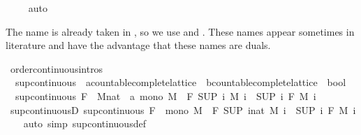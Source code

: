 \begin{isabellebody}
\ \ \ \isamarkupfalse%
\ auto\isanewline
\ \ \isamarkupfalse%
%
\endisatagproof
{\isafoldproof}%
%
\isadelimproof
%
\endisadelimproof
%
\begin{isamarkuptext}%
The name  is already taken in , so we use
   and . These names appear sometimes in literature
  and have the advantage that these names are duals.%
\end{isamarkuptext}\isamarkuptrue%
\isamarkupfalse%
\ order{\isacharunderscore}continuous{\isacharunderscore}intros%
\isadelimdocument
%
\endisadelimdocument
%
\isatagdocument
%
\isamarkuptrue%
%
\endisatagdocument
{\isafolddocument}%
%
\isadelimdocument
%
\endisadelimdocument
{}\isamarkupfalse%
\isanewline
\ \ sup{\isacharunderscore}continuous\ {\isacharcolon}{\isacharcolon}\ {\isachardoublequoteopen}{\isacharparenleft}{\isacharprime}a{\isacharcolon}{\isacharcolon}countable{\isacharunderscore}complete{\isacharunderscore}lattice\ {\isasymRightarrow}\ {\isacharprime}b{\isacharcolon}{\isacharcolon}countable{\isacharunderscore}complete{\isacharunderscore}lattice{\isacharparenright}\ {\isasymRightarrow}\ bool{\isachardoublequoteclose}\isanewline
{}\isanewline
\ \ {\isachardoublequoteopen}sup{\isacharunderscore}continuous\ F\ {\isasymlongleftrightarrow}\ {\isacharparenleft}{\isasymforall}M{\isacharcolon}{\isacharcolon}nat\ {\isasymRightarrow}\ {\isacharprime}a{\isachardot}\ mono\ M\ {\isasymlongrightarrow}\ F\ {\isacharparenleft}SUP\ i{\isachardot}\ M\ i{\isacharparenright}\ {\isacharequal}\ {\isacharparenleft}SUP\ i{\isachardot}\ F\ {\isacharparenleft}M\ i{\isacharparenright}{\isacharparenright}{\isacharparenright}{\isachardoublequoteclose}\isanewline
\isanewline
{}\isamarkupfalse%
\ sup{\isacharunderscore}continuousD{\isacharcolon}\ {\isachardoublequoteopen}sup{\isacharunderscore}continuous\ F\ {\isasymLongrightarrow}\ mono\ M\ {\isasymLongrightarrow}\ F\ {\isacharparenleft}SUP\ i{\isacharcolon}{\isacharcolon}nat{\isachardot}\ M\ i{\isacharparenright}\ {\isacharequal}\ {\isacharparenleft}SUP\ i{\isachardot}\ F\ {\isacharparenleft}M\ i{\isacharparenright}{\isacharparenright}{\isachardoublequoteclose}\isanewline
%
\isadelimproof
\ \ %
\endisadelimproof
%
\isatagproof
{}\isamarkupfalse%
\ {\isacharparenleft}auto\ simp{\isacharcolon}\ sup{\isacharunderscore}continuous{\isacharunderscore}def{\isacharparenright}%

\end{isabellebody}
